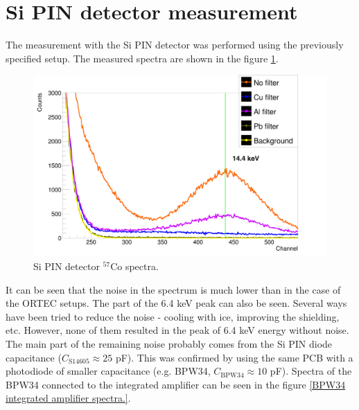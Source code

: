 \section{Si PIN detector measurement}
The measurement with the Si PIN detector was performed using the previously specified setup. The measured spectra are shown in the figure \ref{Si PIN detector spectra.}.
\begin{figure}[H]
 \centering
 \includegraphics[scale=0.125, angle = 0]{./pictures/SemiSpectre.png}
 \caption{Si PIN detector $^{57}$Co spectra.}
 \label{Si PIN detector spectra.}
\end{figure}
It can be seen that the noise in the spectrum is much lower than in the case of the ORTEC setups. The part of the 6.4 keV peak can also be seen. Several ways have been tried to reduce the noise - cooling with ice, improving the shielding, etc. However, none of them resulted in the peak of 6.4 keV energy without noise. The main part of the remaining noise probably comes from the Si PIN diode capacitance ($C_{\textrm{S14605}} \approx 25$ pF). This was confirmed by using the same PCB with a photodiode of smaller capacitance (e.g. BPW34, $C_{\textrm{BPW34}} \approx 10$ pF). Spectra of the BPW34 connected to the integrated amplifier can be seen in the figure \ref{BPW34 integrated amplifier spectra.}.


